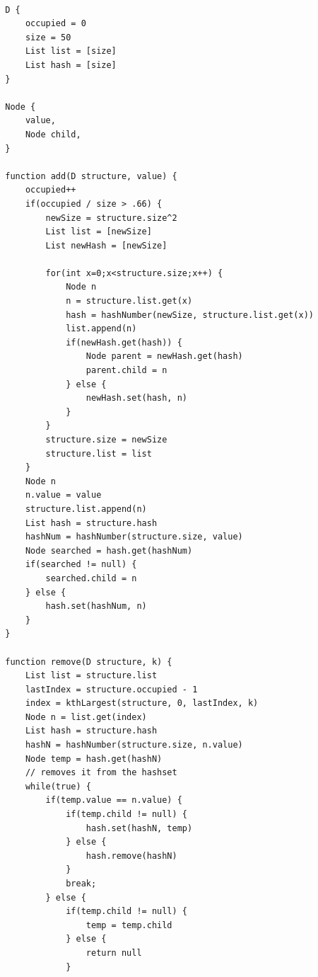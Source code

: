 \documentclass[11pt]{article}
\begin{document}
        \begin{verbatim}
        
        D {
            occupied = 0 
            size = 50
            List list = [size]
            List hash = [size]
        }

        Node {
            value,
            Node child,
        }

        function add(D structure, value) {
            occupied++
            if(occupied / size > .66) {
                newSize = structure.size^2
                List list = [newSize]
                List newHash = [newSize]
                
                for(int x=0;x<structure.size;x++) {
                    Node n
                    n = structure.list.get(x)
                    hash = hashNumber(newSize, structure.list.get(x))
                    list.append(n)
                    if(newHash.get(hash)) {
                        Node parent = newHash.get(hash)
                        parent.child = n
                    } else {
                        newHash.set(hash, n)
                    }
                } 
                structure.size = newSize
                structure.list = list 
            }
            Node n
            n.value = value  
            structure.list.append(n)
            List hash = structure.hash
            hashNum = hashNumber(structure.size, value)
            Node searched = hash.get(hashNum)
            if(searched != null) {
                searched.child = n
            } else {
                hash.set(hashNum, n)
            }
        }

        function remove(D structure, k) {
            List list = structure.list
            lastIndex = structure.occupied - 1
            index = kthLargest(structure, 0, lastIndex, k)
            Node n = list.get(index)
            List hash = structure.hash
            hashN = hashNumber(structure.size, n.value)
            Node temp = hash.get(hashN) 
            // removes it from the hashset
            while(true) {
                if(temp.value == n.value) {
                    if(temp.child != null) {
                        hash.set(hashN, temp)
                    } else {
                        hash.remove(hashN)
                    }
                    break;
                } else {
                    if(temp.child != null) {
                        temp = temp.child
                    } else {
                        return null
                    }
                    

\end{verbatim}
\end{document}
